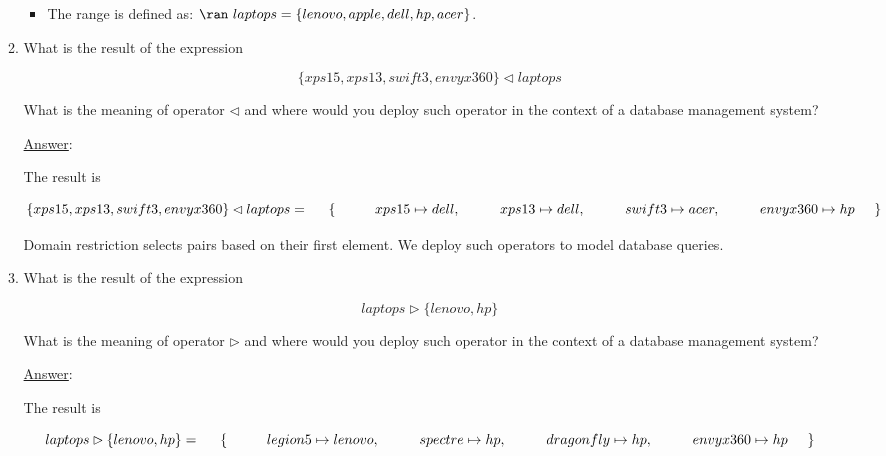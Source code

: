 \documentclass[12pt]{article}
\begin{document}
\begin{enumerate}
\begin{enumerate}
\begin{itemize}
\item The range is defined as:  $\ran~laptops = \{ lenovo, apple, dell, hp, acer \}$.


\end{itemize}


\item What is the result of the expression

\[ \{ xps15, xps13, swift3, envyx360 \}  \lhd laptops \]

\noindent What is the meaning of operator $\lhd$ and where would you deploy such operator in the context of a database management system?

\newpage

\noindent \underline{Answer}:

\noindent The result is 

\[ \{ xps15, xps13, swift3, envyx360 \}  \lhd laptops = \\
\hspace{5mm} \{ \\
\hspace{10mm} xps15 \mapsto dell,\\
\hspace{10mm} xps13 \mapsto dell,\\
\hspace{10mm} swift3 \mapsto acer,\\
\hspace{10mm} envyx360 \mapsto hp\\
\hspace{5mm} \}
\]

\noindent Domain restriction selects pairs based on their first element. We deploy such operators to model database queries. 


\item What is the result of the expression

\[ laptops \rhd \{ lenovo, hp \} \]

\noindent What is the meaning of operator $\rhd$ and where would you deploy such operator in the context of a database management system?

\noindent \underline{Answer}:

\noindent The result is 


\[ laptops \rhd \{ lenovo, hp \} = \\
\hspace{5mm} \{ \\
\hspace{10mm} legion5 \mapsto lenovo,\\
\hspace{10mm} spectre \mapsto hp,\\
\hspace{10mm} dragonfly \mapsto hp,\\
\hspace{10mm} envyx360 \mapsto hp\\
\hspace{5mm} \}
\]


\end{enumerate}
\end{enumerate}
\end{document}
